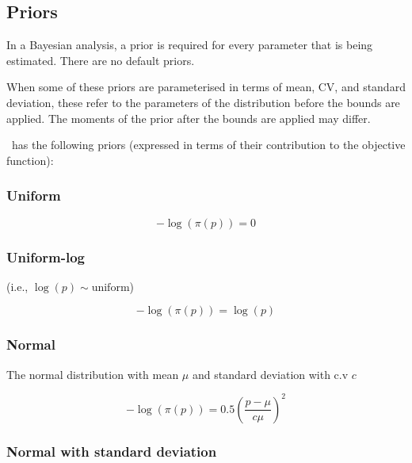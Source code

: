 \subsection{Priors\label{sec:Priors}}

In a Bayesian analysis, a prior is required for every parameter that is being estimated. There are no default priors.

When some of these priors are parameterised in terms of mean, CV, and standard deviation, these refer to the parameters of the distribution before the bounds are applied. The moments of the prior after the bounds are applied may differ.

\CNAME\ has the following priors (expressed in terms of their contribution to the objective function):

\subsubsection{Uniform}\label{sec:Prior-Uniform}

\begin{equation}
 - \log \left(\pi \left(p \right) \right) = 0
\end{equation}

\subsubsection{Uniform-log} (i.e., $\log(p) \sim \text{uniform}$)\label{sec:Prior-UniformLog}

\begin{equation}
 - \log \left(\pi \left(p \right) \right) = \log \left( p \right)
\end{equation}

\subsubsection{Normal}\label{sec:Prior-Normal}

The normal distribution with mean $\mu$ and standard deviation with c.v $c$

\begin{equation}
 - \log \left(\pi \left(p \right) \right) = 0.5\left(\frac{p - \mu}{c\mu} \right)^2
\end{equation}

\subsubsection{Normal with standard deviation}\label{sec:Prior-NormalByStdev}

